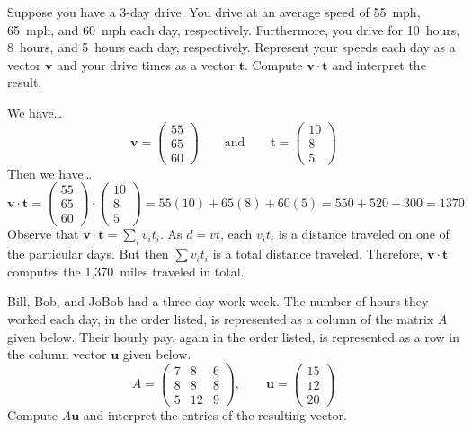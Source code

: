 \documentclass[11pt,letterpaper]{article}
\begin{document}

 Suppose you have a 3-day drive. You drive at an average speed of 55~mph, 65~mph, and 60~mph each day, respectively. Furthermore, you drive for 10~hours, 8~hours, and 5~hours each day, respectively. Represent your speeds each day as a vector $\mathbf{v}$ and your drive times as a vector $\mathbf{t}$. Compute $\mathbf{v} \cdot \mathbf{t}$ and interpret the result. \pspace

\sol We have\dots
	\[
	\mathbf{v}= \begin{pmatrix} 55 \\ 65 \\ 60 \end{pmatrix} \qquad \text{and} \qquad \mathbf{t}= \begin{pmatrix} 10 \\ 8 \\ 5 \end{pmatrix}
	\]
Then we have\dots
	\[
	\mathbf{v} \cdot \mathbf{t}= \begin{pmatrix} 55 \\ 65 \\ 60 \end{pmatrix} \cdot \begin{pmatrix} 10 \\ 8 \\ 5 \end{pmatrix}= 55(10) + 65(8) + 60(5)= 550 + 520 + 300= 1370
	\]
Observe that $\mathbf{v} \cdot \mathbf{t}= \sum_i v_i t_i$. As $d= vt$, each $v_i t_i$ is a distance traveled on one of the particular days. But then $\sum v_i t_i$ is a total distance traveled. Therefore, $\mathbf{v} \cdot \mathbf{t}$ computes the 1,370~miles traveled in total. 



\newpage



 Bill, Bob, and JoBob had a three day work week. The number of hours they worked each day, in the order listed, is represented as a column of the matrix $A$ given below. Their hourly pay, again in the order listed, is represented as a row in the column vector $\mathbf{u}$ given below. 
	\[
	A= \begin{pmatrix} 7 & 8 & 6 \\ 8 & 8 & 8 \\ 5 & 12 & 9 \end{pmatrix}, \qquad \mathbf{u}= \begin{pmatrix} 15 \\ 12 \\ 20 \end{pmatrix}
	\]
Compute $A\mathbf{u}$ and interpret the entries of the resulting vector. \pspace
\end{document}
